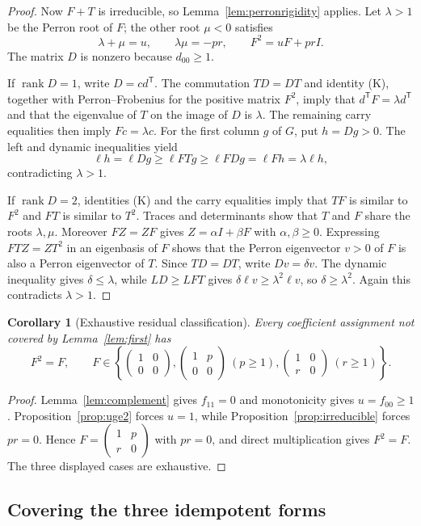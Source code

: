 \documentclass[11pt]{article}
\newtheorem{corollary}[theorem]{Corollary}
\theoremstyle{definition}
\newcommand{\mat}[4]{\begin{pmatrix}#1&#2\\#3&#4\end{pmatrix}}
\begin{document}
\begin{proof}
Now $F+T$ is irreducible, so Lemma~\ref{lem:perronrigidity} applies.  Let
$\lambda>1$ be the Perron root of $F$; the other root $\mu<0$ satisfies
\[
 \lambda+\mu=u,\qquad \lambda\mu=-pr,\qquad
 F^2=uF+prI.
\tag{L}
\]
The matrix $D$ is nonzero because $d_{00}\ge1$.

If $\operatorname{rank}D=1$, write $D=cd^{\mathsf T}$.  The commutation
$TD=DT$ and identity (K), together with Perron--Frobenius for the positive
matrix $F^2$, imply that $d^{\mathsf T}F=\lambda d^{\mathsf T}$ and that
the eigenvalue of $T$ on the image of $D$ is $\lambda$.  The remaining
carry equalities then imply $Fc=\lambda c$.  For the first column $g$ of
$G$, put $h=Dg>0$.  The left and dynamic inequalities yield
\[
 \ell h=\ell Dg\ge\ell FTg\ge\ell FDg
 =\ell Fh=\lambda\ell h,
\]
contradicting $\lambda>1$.

If $\operatorname{rank}D=2$, identities (K) and the carry equalities imply
that $TF$ is similar to $F^2$ and $FT$ is similar to $T^2$.  Traces and
determinants show that $T$ and $F$ share the roots $\lambda,\mu$.
Moreover $FZ=ZF$ gives $Z=\alpha I+\beta F$ with
$\alpha,\beta\ge0$.  Expressing $FTZ=ZT^2$ in an eigenbasis of $F$ shows
that the Perron eigenvector $v>0$ of $F$ is also a Perron eigenvector of
$T$.  Since $TD=DT$, write $Dv=\delta v$.  The dynamic inequality gives
$\delta\le\lambda$, while $LD\ge LFT$ gives
$\delta\ell v\ge\lambda^2\ell v$, so $\delta\ge\lambda^2$.  Again this
contradicts $\lambda>1$.
\end{proof}

\begin{corollary}[Exhaustive residual classification]\label{cor:forms}
Every coefficient assignment not covered by Lemma~\ref{lem:first} has
\[
 F^2=F,\qquad
 F\in\left\{
 \mat{1}{0}{0}{0},
 \mat{1}{p}{0}{0}\ (p\ge1),
 \mat{1}{0}{r}{0}\ (r\ge1)
 \right\}.
\]
\end{corollary}

\begin{proof}
Lemma~\ref{lem:complement} gives $f_{11}=0$ and monotonicity gives
$u=f_{00}\ge1$.  Proposition~\ref{prop:uge2} forces $u=1$, while
Proposition~\ref{prop:irreducible} forces $pr=0$.  Hence
$F=\mat{1}{p}{r}{0}$ with $pr=0$, and direct multiplication gives
$F^2=F$.  The three displayed cases are exhaustive.
\end{proof}

\subsection{Covering the three idempotent forms}
\end{document}
